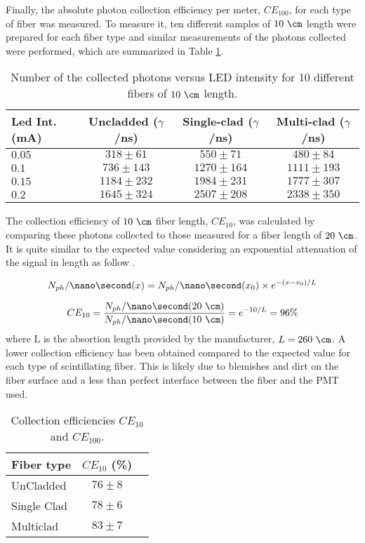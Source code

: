 Finally, the absolute photon collection efficiency per meter, $CE_{100}$, for each type of fiber was measured. To measure it, ten different samples of $10~\cm$ length were prepared for each fiber type and similar measurements of the photons collected were performed, which are summarized in Table \ref{tab:10DifferentSamplesAlltypes}.

\begin{table}[htbp]
\centering{}%
\begin{tabular}{lccc}
\toprule 
Led Int. (mA) & Uncladded ($\gamma$/ns) & Single-clad ($\gamma$/ns) & Multi-clad ($\gamma$/ns) \tabularnewline
\midrule
\midrule 
$0.05$ & $318 \pm 61$ & $550 \pm 71$ & $480 \pm 84$ \tabularnewline
$0.1$ & $736 \pm 143$ & $1270 \pm 164$ & $1111 \pm 193$ \tabularnewline
$0.15$ & $1184 \pm 232$ & $1984 \pm 231$ & $1777\pm 307$ \tabularnewline
$0.2$ & $1645 \pm 324$ & $2507 \pm 208$ & $2338 \pm 350$ \tabularnewline
\bottomrule
\end{tabular}
\caption{Number of the collected photons versus LED intensity for 10 different fibers of $10~\cm$ length.}
\label{tab:10DifferentSamplesAlltypes}
\end{table}
The collection efficiency of $10~\cm$ fiber length, $CE_{10}$, was calculated by comparing these photons collected to those measured for a fiber length of $20~\cm$. It is quite similar to the expected value considering an exponential attenuation of the signal in length as follow \cite{}.

\begin{equation}
N_{ph}/\nano\second(x) = N_{ph}/\nano\second(x_0) \times e^{-(x-x_0)/L}
\label{eq:ExponentialAttenuation}
\end{equation}

\begin{equation}
CE_{10}=\frac{N_{ph}/\nano\second(20~\cm)}{N_{ph}/\nano\second(10~\cm)}=e^{-10/L}=96\%
\label{eq:CollectionEfficiency}
\end{equation}
where L is the absortion length provided by the manufacturer, $L=260~\cm$. A lower collection efficiency has been obtained compared to the expected value for each type of scintillating fiber. This is likely due to blemishes and dirt on the fiber surface and a less than perfect interface between the fiber and the PMT used.

\begin{table}[htbp]
\centering{}%
\begin{tabular}{lcc}
\toprule 
Fiber type & $CE_{10}$ (\%) \tabularnewline
\midrule
\midrule 
UnCladded & $76 \pm 8$ \tabularnewline
Single Clad & $78 \pm 6$ \tabularnewline
Multiclad & $83 \pm 7$ \tabularnewline
\bottomrule
\end{tabular}
\caption{Collection efficiencies $CE_{10}$ and $CE_{100}$.}
\label{tab:CollectionEfficiencyOfFibers}
\end{table}


